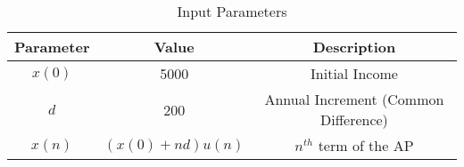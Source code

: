 \begin{table}[h!]
    \centering
    \caption{Input Parameters}
    \label{tab:1}
    \begin{tabular}{ | c | c | c | }
        \hline
        Parameter & Value & Description \\
        \hline
        $x(0)$ & 5000 & Initial Income \\
        \hline
        $d$ & 200 & Annual Increment (Common Difference) \\
        \hline
        $x(n)$ & $(x(0) + nd)u(n)$ & $n^{th}$ term of the AP \\
        \hline
    \end{tabular}
\end{table}